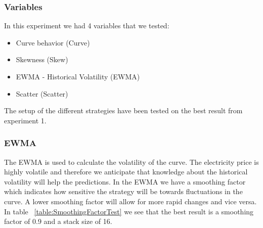 \subsubsection{Variables}
In this experiment we had 4 variables that we tested:
\begin{itemize}
	\item Curve behavior (Curve)
	\item Skewness (Skew)
	\item EWMA - Historical Volatility (EWMA)
	\item Scatter (Scatter)
\end{itemize}

The setup of the different strategies have been tested on the best result from experiment 1.

\subsubsection{EWMA}
\begin{table}[H]
\centering  %
\caption{Smoothing factor test} %
\label{table:SmoothingFactorTest} %
\end{table}

The EWMA is used to calculate the volatility of the curve. The electricity price is highly volatile and therefore we anticipate that knowledge about the historical volatility will help the predictions. In the EWMA we have a smoothing factor which indicates how sensitive the strategy will be towards fluctuations in the curve. A lower smoothing factor will allow for more rapid changes and vice versa. In table ~\ref{table:SmoothingFactorTest} we see that the best result is a smoothing factor of 0.9 and a stack size of 16.


